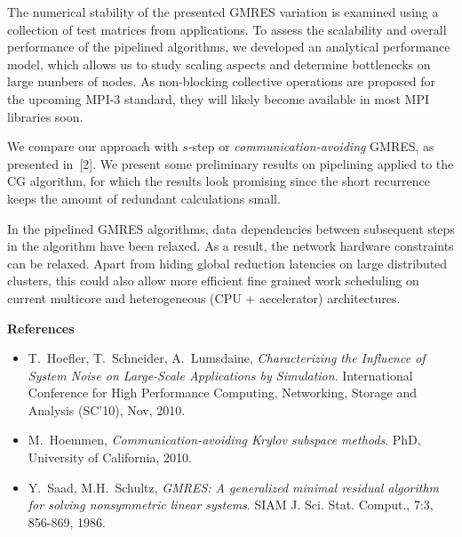 \documentclass{report}
\begin{document}
The numerical stability of the presented GMRES variation is examined
using a collection of test matrices from applications. To assess the
scalability and overall performance of the pipelined algorithms, we
developed an analytical performance model, which allows us to study
scaling aspects and determine bottlenecks on large numbers of nodes. As
non-blocking collective operations are proposed for the upcoming MPI-3
standard, they will likely become available in most MPI libraries soon.

We compare our approach with $s$-step or \emph{communication-avoiding}
GMRES, as presented in~[2]. We present some preliminary results on
pipelining applied to the CG algorithm, for which the results look
promising since the short recurrence keeps the amount of redundant
calculations small.

In the pipelined GMRES algorithms, data dependencies between subsequent
steps in the algorithm have been relaxed. As a result, the network
hardware constraints can be relaxed. Apart from hiding global reduction
latencies on large distributed clusters, this could also allow more
efficient fine grained work scheduling on current multicore and
heterogeneous (CPU + accelerator) architectures.


\textbf{References}
\begin{itemize}
\item[1.] T.~Hoefler, T.~Schneider, A.~Lumsdaine, \emph{Characterizing
the Influence of System Noise on Large-Scale Applications by Simulation}.
International Conference for High Performance Computing, Networking,
Storage and Analysis (SC'10), Nov, 2010.

\item[2.] M.~Hoemmen, \emph{Communication-avoiding Krylov subspace
methods}. PhD, University of California, 2010.

\item[3.] Y.~Saad, M.H.~Schultz, \emph{GMRES: A generalized minimal
residual algorithm for solving nonsymmetric linear systems}. SIAM J. Sci.
Stat. Comput., 7:3, 856-869, 1986.
\end{itemize}
\end{document}
